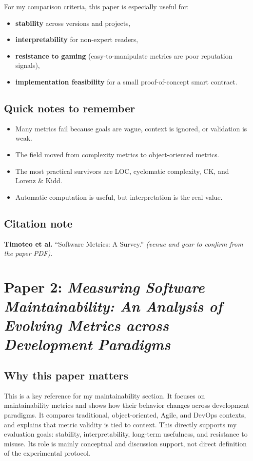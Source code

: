 \documentclass[11pt,a4paper]{article}
\begin{document}
For my comparison criteria, this paper is especially useful for:
\begin{itemize}[leftmargin=*]
  \item \textbf{stability} across versions and projects,
  \item \textbf{interpretability} for non-expert readers,
  \item \textbf{resistance to gaming} (easy-to-manipulate metrics are poor reputation signals),
  \item \textbf{implementation feasibility} for a small proof-of-concept smart contract.
\end{itemize}

\subsection{Quick notes to remember}
\begin{itemize}[leftmargin=*]
  \item Many metrics fail because goals are vague, context is ignored, or validation is weak.
  \item The field moved from complexity metrics to object-oriented metrics.
  \item The most practical survivors are LOC, cyclomatic complexity, CK, and Lorenz \& Kidd.
  \item Automatic computation is useful, but interpretation is the real value.
\end{itemize}

\subsection{Citation note}
\noindent\textbf{Timoteo et al.} ``Software Metrics: A Survey.'' \textit{(venue and year to confirm from the paper PDF).}

\newpage
\section{Paper 2: \textit{Measuring Software Maintainability: An Analysis of Evolving Metrics across Development Paradigms}}

\subsection{Why this paper matters}
This is a key reference for my maintainability section. It focuses on maintainability metrics and shows how their behavior changes across development paradigms. It compares traditional, object-oriented, Agile, and DevOps contexts, and explains that metric validity is tied to context. This directly supports my evaluation goals: stability, interpretability, long-term usefulness, and resistance to misuse.
Its role is mainly conceptual and discussion support, not direct definition of the experimental protocol.
\end{document}
